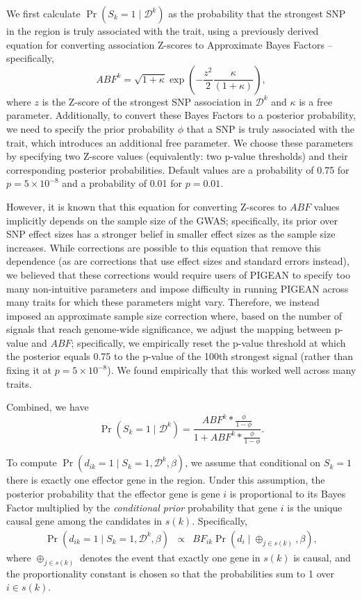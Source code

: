 \documentclass[11pt]{article}
\begin{document}
We first calculate $\Pr(S_k=1 \mid \mathcal{D}^k)$ as the probability that the
strongest SNP in the region is truly associated with the trait, using a
previously derived equation for converting association Z-scores to Approximate
Bayes Factors\cite{} -- specifically,
\[
ABF^k = \sqrt{1+\kappa}\exp\left(-\frac{z^2}{2}\frac{\kappa}{\left(1+\kappa\right)}\right),
\]
where $z$ is the Z-score of the strongest SNP association in $\mathcal{D}^k$
and $\kappa$ is a free parameter. Additionally, to convert these Bayes Factors
to a posterior probability, we need to specify the prior probability $\phi$
that a SNP is truly associated with the trait, which introduces an additional
free parameter. We choose these parameters by specifying two Z-score values
(equivalently: two p-value thresholds) and their corresponding posterior
probabilities. Default values are a probability of 0.75 for
$p=5\times10^{-8}$ and a probability of 0.01 for $p=0.01$.

However, it is known\cite{} that this equation for converting Z-scores to
$ABF$ values implicitly depends on the sample size of the GWAS; specifically,
its prior over SNP effect sizes has a stronger belief in smaller effect sizes
as the sample size increases. While corrections are possible to this equation
that remove this dependence (as are corrections that use effect sizes and
standard errors instead), we believed that these corrections would require
users of PIGEAN to specify too many non-intuitive parameters and impose
difficulty in running PIGEAN across many traits for which these parameters
might vary. Therefore, we instead imposed an approximate sample size
correction where, based on the number of signals that reach genome-wide
significance, we adjust the mapping between p-value and $ABF$; specifically,
we empirically reset the p-value threshold at which the posterior equals 0.75
to the p-value of the 100th strongest signal (rather than fixing it at
$p=5\times10^{-8}$). We found empirically that this worked well across many
traits.

Combined, we have
\[
\Pr(S_k=1 \mid \mathcal{D}^k) = \frac{ABF^k * \frac{\phi}{1-\phi}}{1 + ABF^k * \frac{\phi}{1-\phi}}.
\]

To compute $\Pr(d_{ik}=1 \mid S_k=1,\mathcal{D}^k,\beta)$, we assume that
conditional on $S_k=1$ there is exactly one effector gene in the region. Under
this assumption, the posterior probability that the effector gene is gene $i$
is proportional to its Bayes Factor multiplied by the \emph{conditional prior}
probability that gene $i$ is the unique causal gene among the candidates in
$s(k)$\cite{Maller}. Specifically,
\begin{eqnarray*}
\Pr(d_{ik}=1 \mid S_k=1,\mathcal{D}^k,\beta) &\propto&
BF_{ik}\Pr\left(d_i \mid \oplus_{j\in s(k)},\beta\right),
\end{eqnarray*}
where $\oplus_{j\in s(k)}$ denotes the event that exactly one gene in $s(k)$ is
causal, and the proportionality constant is chosen so that the probabilities
sum to 1 over $i \in s(k)$.
\end{document}
